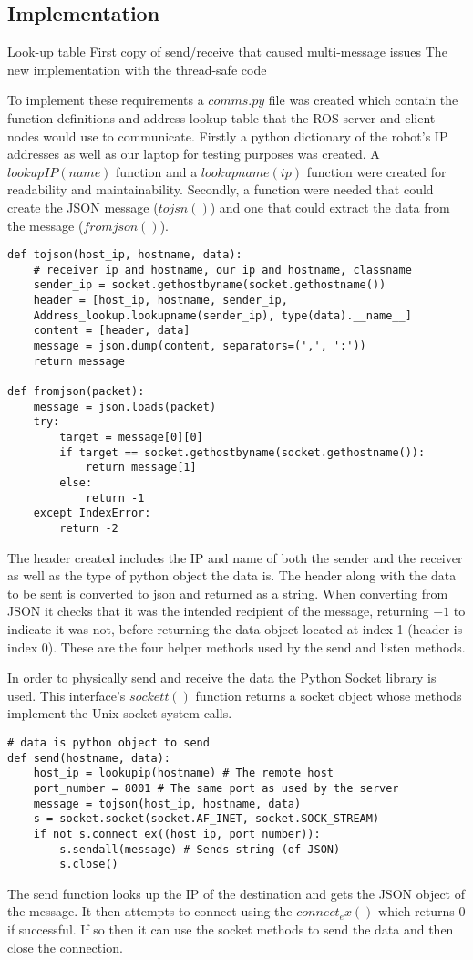 \subsection{Implementation}\label{soft/comms/impl}
Look-up table
First copy of send/receive that caused multi-message issues
The new implementation with the thread-safe code

To implement these requirements a $comms.py$ file was created which contain 
the function definitions and address lookup table that the ROS server and 
client nodes would use to communicate. Firstly a python dictionary of the 
robot's IP addresses as well as our laptop for testing purposes was created. 
A $lookupIP(name)$ function and a $lookupname(ip)$ function were created for 
readability and maintainability. Secondly, a function were needed that could 
create the JSON message ($tojsn()$) and one that could extract the data from 
the message ($fromjson()$). 

\begin{lstlisting}
def tojson(host_ip, hostname, data):
    # receiver ip and hostname, our ip and hostname, classname
    sender_ip = socket.gethostbyname(socket.gethostname())
    header = [host_ip, hostname, sender_ip, 
    Address_lookup.lookupname(sender_ip), type(data).__name__]
    content = [header, data]
    message = json.dump(content, separators=(',', ':'))
    return message

def fromjson(packet):
    message = json.loads(packet)
    try:
        target = message[0][0]
        if target == socket.gethostbyname(socket.gethostname()):
            return message[1]
        else:
            return -1
    except IndexError:
        return -2
\end{lstlisting} 
The header created includes the IP and name of both the sender and the 
receiver as well as the type of python object the data is. The header along 
with the data to be sent is converted to json and returned as a string. When  converting from JSON it checks that it was the intended recipient of the 
message, returning $-1$ to indicate it was not, before returning the data 
object located at index 1 (header is index 0). These are the four helper 
methods used by the send and listen methods.

In order to physically send and receive the data the Python Socket library 
is used. This interface's $sockett()$ function returns a socket object whose 
methods implement the Unix socket system calls. 
\begin{lstlisting}
# data is python object to send
def send(hostname, data):
    host_ip = lookupip(hostname) # The remote host
    port_number = 8001 # The same port as used by the server
    message = tojson(host_ip, hostname, data)
    s = socket.socket(socket.AF_INET, socket.SOCK_STREAM)
    if not s.connect_ex((host_ip, port_number)):
        s.sendall(message) # Sends string (of JSON)
        s.close()
\end{lstlisting}
The send function looks up the IP of the destination and gets the JSON object 
of the message. It then attempts to connect using the $connect_ex()$ which 
returns 0 if successful. If so then it can use the socket methods to send the 
data and then close the connection. 

